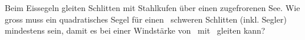 Beim Eissegeln gleiten Schlitten mit Stahlkufen über einen zugefrorenen See. Wie gross muss ein quadratisches Segel für einen \mEsO\ schweren Schlitten (inkl. Segler) mindestens sein, damit es bei einer Windstärke von \vWEO\ mit \vSEO\ gleiten kann?
